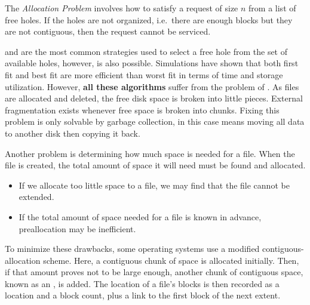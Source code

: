 \begin{definition}\label{def:Allocation_Problem}
  The \emph{Allocation Problem} involves how to satisfy a request of size $n$ from a list of free holes.
  If the holes are not organized, i.e.\ there are enough blocks but they are not contiguous, then the request cannot be serviced.
\end{definition}

 and  are the most common strategies used to select a free hole from the set of available holes, however,  is also possible.
Simulations have shown that both first fit and best fit are more efficient than worst fit in terms of time and storage utilization.
However, \textbf{all these algorithms} suffer from the problem of .
As files are allocated and deleted, the free disk space is broken into little pieces.
External fragmentation exists whenever free space is broken into chunks.
Fixing this problem is only solvable by garbage collection, in this case means moving all data to another disk then copying it back.

Another problem is determining how much space is needed for a file.
When the file is created, the total amount of space it will need must be found and allocated.
\begin{itemize}[noitemsep]
\item If we allocate too little space to a file, we may find that the file cannot be extended.
\item If the total amount of space needed for a file is known in advance, preallocation may be inefficient.
\end{itemize}

To minimize these drawbacks, some operating systems use a modified contiguous-allocation scheme.
Here, a contiguous chunk of space is allocated initially.
Then, if that amount proves not to be large enough, another chunk of contiguous space, known as an , is added.
The location of a file’s blocks is then recorded as a location and a block count, plus a link to the first block of the next extent.



